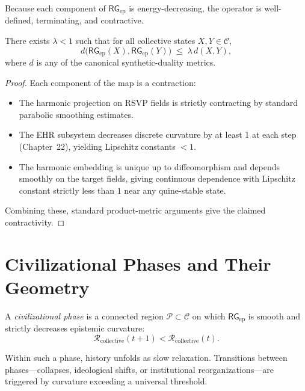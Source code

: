 Because each component of $\mathsf{RG}_{\mathrm{ep}}$ is energy-decreasing,
the operator is well-defined, terminating, and contractive.

\begin{proposition}[Contractivity]
There exists $\lambda<1$ such that for all collective states
$X,Y \in \mathcal{C}$,
\[
d\bigl( \mathsf{RG}_{\mathrm{ep}}(X),
        \mathsf{RG}_{\mathrm{ep}}(Y) \bigr)
\;\le\;
\lambda\, d(X,Y),
\]
where $d$ is any of the canonical synthetic-duality metrics.
\end{proposition}

\begin{proof}
Each component of the map is a contraction:

\begin{itemize}
\item The harmonic projection on RSVP fields is strictly contracting
      by standard parabolic smoothing estimates.
\item The EHR subsystem decreases discrete curvature by at least $1$ at
      each step (Chapter~22), yielding Lipschitz constants $<1$.
\item The harmonic embedding is unique up to diffeomorphism and depends
      smoothly on the target fields, giving continuous dependence with
      Lipschitz constant strictly less than $1$ near any quine-stable
      state.
\end{itemize}

Combining these, standard product-metric arguments give the claimed
contractivity.
\end{proof}

\section{Civilizational Phases and Their Geometry}

\begin{definition}
A \emph{civilizational phase} is a connected region
$\mathcal{P}\subset\mathcal{C}$ on which
$\mathsf{RG}_{\mathrm{ep}}$ is smooth and strictly decreases
epistemic curvature:
\[
\mathcal{R}_{\mathrm{collective}}(t+1)
<
\mathcal{R}_{\mathrm{collective}}(t).
\]
\end{definition}

Within such a phase, history unfolds as slow relaxation.
Transitions between phases---collapses, ideological shifts, or
institutional reorganizations---are triggered by curvature exceeding a
universal threshold.


